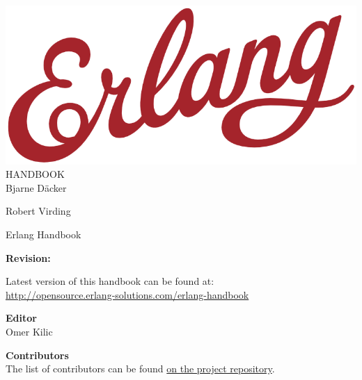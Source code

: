 \documentclass[oneside]{book}
\begin{document}
\begin{titlepage}
\centering

\vspace*{70pt}
\includegraphics[scale=0.3]{includes/erlang-logo.png}\\[0.8\baselineskip]
{\Huge \sffamily HANDBOOK}\\
\vspace{250pt}
{\LARGE \sffamily Bjarne D\"acker}\par
{\LARGE \sffamily Robert Virding}\par

\end{titlepage}


\clearpage
\thispagestyle{empty}
{\Huge Erlang Handbook}\\[0.1\baselineskip]

\vspace{20pt}
{\Large \textbf{Revision:}\\[0.2\baselineskip]
\immediate{}

\immediate{}
}

\vspace{20pt}
{\large Latest version of this handbook can be found at:\\
\url{http://opensource.erlang-solutions.com/erlang-handbook}}

\vfill

\textbf{Editor}\\[0.1\baselineskip]
Omer Kilic

\textbf{Contributors}\\[0.1\baselineskip]
The list of contributors can be found \href{https://github.com/esl/erlang-handbook/graphs/contributors}{on the project repository}.
\end{document}
